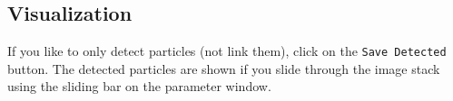 \documentclass{scrartcl}
\begin{document}


\subsection{Visualization}
\label{sec:visualizing}
If you like to only detect particles (not link them), click on the \texttt{Save Detected} button. The detected particles are shown if you slide through the image stack using the sliding bar on the parameter window. 
\end{document}
